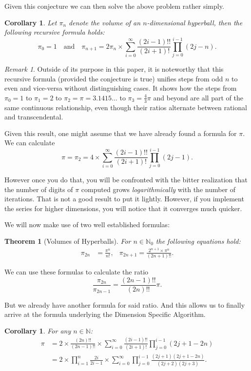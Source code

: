 \documentclass[a4paper,11pt]{scrartcl}
\newcounter{theoremcounter}
\theoremstyle{definition}
\theoremstyle{plain}
\newtheorem{mytheorem}[theoremcounter]{Theorem}
\newtheorem{mycorollary}[theoremcounter]{Corollary}
\theoremstyle{remark}
\newtheorem*{myremark}{Remark}
\begin{document}
Given this conjecture we can then solve the above problem rather simply.

\begin{mycorollary}
Let $\pi_n$ denote the volume of an $n$-dimensional hyperball, then the following recursive formula holds:
\[
\pi_0 = 1
\quad \text{and} \quad
\pi_{n+1} = 2 \pi_n \times \sum_{i=0}^{\infty} \frac{(2i-1)!!}{(2i+1)!} \prod_{j=0}^{i-1} (2j - n).
\]
\end{mycorollary}

\begin{myremark}
Outside of its purpose in this paper, it is noteworthy that this recursive formula (provided the conjecture is true) unifies steps from odd $n$ to even and vice-versa without distinguishing cases.
It shows how the steps from $\pi_0 = 1$ to $\pi_1 = 2$ to $\pi_2 = \pi = 3.1415\dots$ to $\pi_3 = \frac{4}{3} \pi$ and beyond are all part of the same continuous relationship, even though their ratios alternate between rational and transcendental.
\end{myremark}

Given this result, one might assume that we have already found a formula for $\pi$.
We can calculate
\[
\pi = \pi_2
= 4 \times \sum_{i=0}^{\infty} \frac{(2i-1)!!}{(2i+1)!} \prod_{j=0}^{i-1} (2j - 1).
\]

However once you do that, you will be confronted with the bitter realization that the number of digits of $\pi$ computed grows \emph{logarithmically} with the number of iterations.
That is not a good result to put it lightly.
However, if you implement the series for higher dimensions, you will notice that it converges much quicker.

We will now make use of two well established formulas:
\begin{mytheorem}[Volumes of Hyperballs]
For $n \in \mathbb{N}_0$ the following equations hold:
\begin{align*}
\pi_{2n} &= \frac{\pi^n}{n!},
& \pi_{2n+1} = \frac{2^{n+1} \times \pi^n}{(2n + 1)!!}.
\end{align*}
\end{mytheorem}

We can use these formulas to calculate the ratio
\[
\frac{\pi_{2n}}{\pi_{2n-1}} = \frac{(2n-1)!!}{(2n)!!} \pi.
\]

But we already have another formula for said ratio.
And this allows us to finally arrive at the formula underlying the Dimension Specific Algorithm.

\begin{mycorollary}
For any $n \in \mathbb{N}$:
\begin{align*}
\pi &= 2 \times \frac{(2n)!!}{(2n-1)!!} \times \sum_{i=0}^\infty \frac{(2i-1)!!}{(2i+1)!} \prod_{j=0}^{i-1}(2j + 1 - 2n) \\
&= 2 \times \prod_{i=1}^{n} \frac{2i}{2i - 1} \times \sum_{i=0}^\infty \prod_{j=0}^{i-1}\frac{(2j+1)(2j + 1 - 2n)}{(2j+2)(2j+3)}.
\end{align*}
\end{mycorollary}
\end{document}
